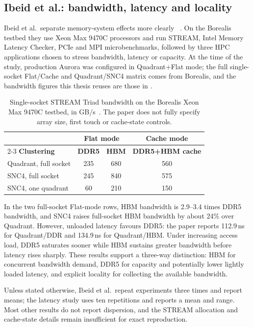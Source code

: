 \subsection{Ibeid et al.: bandwidth, latency and locality}
\label{sec:ibeid-review}

Ibeid et al.\ separate memory-system effects more clearly
~\cite{ibeid2025aurora}.  On the Borealis testbed they use Xeon Max
9470C processors and run STREAM, Intel Memory Latency Checker, PCIe and
MPI microbenchmarks, followed by three HPC applications chosen to stress
bandwidth, latency or capacity.  At the time of the study, production
Aurora was configured in Quadrant+Flat mode; the full single-socket
Flat/Cache and Quadrant/SNC4 matrix comes from Borealis, and the
bandwidth figures this thesis reuses are those in
.

\begin{table}[htbp]
\centering
\small
\tabsetup
\caption{Single-socket STREAM Triad bandwidth on the Borealis Xeon Max
9470C testbed, in GB/s~\cite{ibeid2025aurora}.  The paper does not fully
specify array size, first touch or cache-state controls.}
\label{tab:ibeid-stream}
\begin{tabular}{@{}lccc@{}}
\toprule
\headrow
 & \multicolumn{2}{c}{\textbf{Flat mode}} & \textbf{Cache mode} \\
\cmidrule(lr){2-3}
\textbf{Clustering} & \textbf{DDR5} & \textbf{HBM} & \textbf{DDR5+HBM cache} \\
\midrule
Quadrant, full socket & 235 & 680 & 560 \\
SNC4, full socket     & 245 & 840 & 575 \\
SNC4, one quadrant    &  60 & 210 & 150 \\
\bottomrule
\end{tabular}
\end{table}

In the two full-socket Flat-mode rows, HBM bandwidth is 2.9--3.4 times
DDR5 bandwidth, and SNC4 raises full-socket HBM bandwidth by about 24\%
over Quadrant.
However, unloaded latency favours DDR5: the paper reports 112.9\,ns for
Quadrant/DDR and 134.9\,ns for Quadrant/HBM.  Under increasing access
load, DDR5 saturates sooner while HBM sustains greater bandwidth before
latency rises sharply.  These results support a three-way distinction:
HBM for concurrent bandwidth demand, DDR5 for capacity and potentially
lower lightly loaded latency, and explicit locality for collecting the
available bandwidth.

Unless stated otherwise, Ibeid et al.\ repeat experiments three times
and report means; the latency study uses ten repetitions and reports a
mean and range.  Most other results do not report dispersion, and the
STREAM allocation and cache-state details remain insufficient for exact
reproduction.

